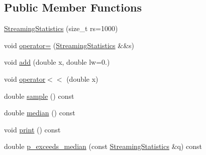 \subsection*{Public Member Functions}
\begin{DoxyCompactItemize}
\item 
\hyperlink{class_fleet_1_1_statistics_1_1_streaming_statistics_a7b22725325625cc7f8c89cce4a19c719}{Streaming\+Statistics} (size\+\_\+t rs=1000)
\item 
void \hyperlink{class_fleet_1_1_statistics_1_1_streaming_statistics_a78daaf22f5e2abd44f82b2e8d2f2cb55}{operator=} (\hyperlink{class_fleet_1_1_statistics_1_1_streaming_statistics}{Streaming\+Statistics} \&\&s)
\item 
void \hyperlink{class_fleet_1_1_statistics_1_1_streaming_statistics_a19575656208452c5ea2bb66257a09c0f}{add} (double x, double lw=0.)
\item 
void \hyperlink{class_fleet_1_1_statistics_1_1_streaming_statistics_af5bcdaff2f20a0048a5b28af8582adf3}{operator$<$$<$} (double x)
\item 
double \hyperlink{class_fleet_1_1_statistics_1_1_streaming_statistics_a65b06c5de083ac12d5b74facd5444973}{sample} () const
\item 
double \hyperlink{class_fleet_1_1_statistics_1_1_streaming_statistics_a70d2554ea987b7e3278b018fdc5ca95a}{median} () const
\item 
void \hyperlink{class_fleet_1_1_statistics_1_1_streaming_statistics_acae72aac2b6ad1ce89e725c001e4e833}{print} () const
\item 
double \hyperlink{class_fleet_1_1_statistics_1_1_streaming_statistics_a0b7d6df2facb2257ec8ef7d4de68fd52}{p\+\_\+exceeds\+\_\+median} (const \hyperlink{class_fleet_1_1_statistics_1_1_streaming_statistics}{Streaming\+Statistics} \&q) const
\end{DoxyCompactItemize}
